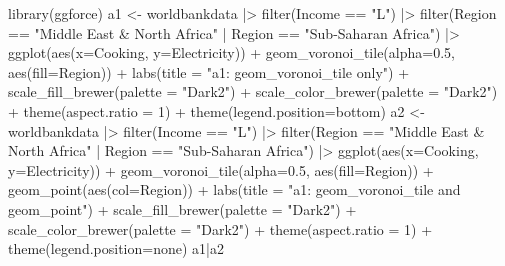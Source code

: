 \documentclass[
  letterpaper,
  DIV=11,
  numbers=noendperiod]{scrreprt}
\newenvironment{Shaded}{\begin{snugshade}}{\end{snugshade}}
\newcommand{\AttributeTok}[1]{\textcolor[rgb]{0.40,0.45,0.13}{#1}}
\newcommand{\DecValTok}[1]{\textcolor[rgb]{0.68,0.00,0.00}{#1}}
\newcommand{\FloatTok}[1]{\textcolor[rgb]{0.68,0.00,0.00}{#1}}
\newcommand{\FunctionTok}[1]{\textcolor[rgb]{0.28,0.35,0.67}{#1}}
\newcommand{\NormalTok}[1]{\textcolor[rgb]{0.00,0.23,0.31}{#1}}
\newcommand{\OtherTok}[1]{\textcolor[rgb]{0.00,0.23,0.31}{#1}}
\newcommand{\SpecialCharTok}[1]{\textcolor[rgb]{0.37,0.37,0.37}{#1}}
\newcommand{\StringTok}[1]{\textcolor[rgb]{0.13,0.47,0.30}{#1}}
\begin{document}
\begin{Shaded}
\begin{Highlighting}[]
\FunctionTok{library}\NormalTok{(ggforce)}
\NormalTok{a1 }\OtherTok{\textless{}{-}}\NormalTok{ worldbankdata }\SpecialCharTok{|\textgreater{}}
  \FunctionTok{filter}\NormalTok{(Income }\SpecialCharTok{==} \StringTok{"L"}\NormalTok{) }\SpecialCharTok{|\textgreater{}}
  \FunctionTok{filter}\NormalTok{(Region }\SpecialCharTok{==} \StringTok{"Middle East \& North Africa"} \SpecialCharTok{|}\NormalTok{ Region }\SpecialCharTok{==} \StringTok{"Sub{-}Saharan Africa"}\NormalTok{) }\SpecialCharTok{|\textgreater{}}
  \FunctionTok{ggplot}\NormalTok{(}\FunctionTok{aes}\NormalTok{(}\AttributeTok{x=}\NormalTok{Cooking, }\AttributeTok{y=}\NormalTok{Electricity)) }\SpecialCharTok{+}   
  \FunctionTok{geom\_voronoi\_tile}\NormalTok{(}\AttributeTok{alpha=}\FloatTok{0.5}\NormalTok{, }\FunctionTok{aes}\NormalTok{(}\AttributeTok{fill=}\NormalTok{Region)) }\SpecialCharTok{+} 
  \FunctionTok{labs}\NormalTok{(}\AttributeTok{title =} \StringTok{"a1: geom\_voronoi\_tile only"}\NormalTok{) }\SpecialCharTok{+}
  \FunctionTok{scale\_fill\_brewer}\NormalTok{(}\AttributeTok{palette =} \StringTok{"Dark2"}\NormalTok{) }\SpecialCharTok{+}
  \FunctionTok{scale\_color\_brewer}\NormalTok{(}\AttributeTok{palette =} \StringTok{"Dark2"}\NormalTok{) }\SpecialCharTok{+}
  \FunctionTok{theme}\NormalTok{(}\AttributeTok{aspect.ratio =} \DecValTok{1}\NormalTok{) }\SpecialCharTok{+} 
  \FunctionTok{theme}\NormalTok{(}\AttributeTok{legend.position=}\StringTok{\textquotesingle{}bottom\textquotesingle{}}\NormalTok{)}
\NormalTok{a2 }\OtherTok{\textless{}{-}}\NormalTok{ worldbankdata }\SpecialCharTok{|\textgreater{}}
  \FunctionTok{filter}\NormalTok{(Income }\SpecialCharTok{==} \StringTok{"L"}\NormalTok{) }\SpecialCharTok{|\textgreater{}}
  \FunctionTok{filter}\NormalTok{(Region }\SpecialCharTok{==} \StringTok{"Middle East \& North Africa"} \SpecialCharTok{|}\NormalTok{ Region }\SpecialCharTok{==} \StringTok{"Sub{-}Saharan Africa"}\NormalTok{) }\SpecialCharTok{|\textgreater{}}
  \FunctionTok{ggplot}\NormalTok{(}\FunctionTok{aes}\NormalTok{(}\AttributeTok{x=}\NormalTok{Cooking, }\AttributeTok{y=}\NormalTok{Electricity)) }\SpecialCharTok{+}   
  \FunctionTok{geom\_voronoi\_tile}\NormalTok{(}\AttributeTok{alpha=}\FloatTok{0.5}\NormalTok{, }\FunctionTok{aes}\NormalTok{(}\AttributeTok{fill=}\NormalTok{Region)) }\SpecialCharTok{+} 
  \FunctionTok{geom\_point}\NormalTok{(}\FunctionTok{aes}\NormalTok{(}\AttributeTok{col=}\NormalTok{Region)) }\SpecialCharTok{+} 
  \FunctionTok{labs}\NormalTok{(}\AttributeTok{title =} \StringTok{"a1: geom\_voronoi\_tile and  geom\_point"}\NormalTok{) }\SpecialCharTok{+}
  \FunctionTok{scale\_fill\_brewer}\NormalTok{(}\AttributeTok{palette =} \StringTok{"Dark2"}\NormalTok{) }\SpecialCharTok{+}
  \FunctionTok{scale\_color\_brewer}\NormalTok{(}\AttributeTok{palette =} \StringTok{"Dark2"}\NormalTok{) }\SpecialCharTok{+}
  \FunctionTok{theme}\NormalTok{(}\AttributeTok{aspect.ratio =} \DecValTok{1}\NormalTok{) }\SpecialCharTok{+}
  \FunctionTok{theme}\NormalTok{(}\AttributeTok{legend.position=}\StringTok{\textquotesingle{}none\textquotesingle{}}\NormalTok{)}
\NormalTok{a1}\SpecialCharTok{|}\NormalTok{a2}
\end{Highlighting}
\end{Shaded}
\end{document}
